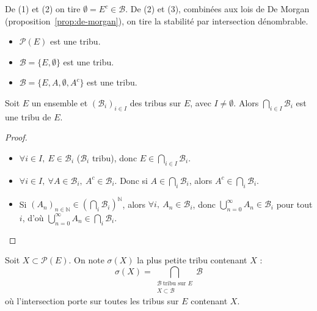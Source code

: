\begin{remarque}
De (1) et (2) on tire $\emptyset = E^c \in \mathcal{B}$. De (2) et (3), combinées aux lois de De Morgan (proposition~\ref{prop:de-morgan}), on tire la stabilité par intersection dénombrable.
\end{remarque}

\begin{exemple}
\begin{itemize}
\item $\mathcal{P}(E)$ est une tribu.
\item $\mathcal{B}=\{E,\emptyset\}$ est une tribu.
\item $\mathcal{B}=\{E,A,\emptyset,A^c\}$ est une tribu.
\end{itemize}
\end{exemple}

\begin{prop}
\label{prop:inter-tribus}
Soit $E$ un ensemble et $(\mathcal{B}_i)_{i\in I}$ des tribus sur $E$, avec $I\neq\emptyset$. Alors $\displaystyle\bigcap_{i\in I}\mathcal{B}_i$ est une tribu de $E$.
\end{prop}

\begin{proof}
\begin{itemize}
\item $\forall i\in I,\ E\in\mathcal{B}_i$ ($\mathcal{B}_i$ tribu), donc $E\in\displaystyle\bigcap_{i\in I}\mathcal{B}_i$.
\item $\forall i\in I,\ \forall A\in\mathcal{B}_i,\ A^c\in\mathcal{B}_i$. Donc si $A\in\displaystyle\bigcap_i\mathcal{B}_i$, alors $A^c\in\displaystyle\bigcap_i\mathcal{B}_i$.
\item Si $(A_n)_{n\in\mathbb{N}} \in \left(\displaystyle\bigcap_i\mathcal{B}_i\right)^{\mathbb{N}}$, alors $\forall i,\ A_n\in\mathcal{B}_i$, donc $\displaystyle\bigcup_{n=0}^{\infty}A_n\in\mathcal{B}_i$ pour tout $i$, d'où $\displaystyle\bigcup_{n=0}^{\infty}A_n \in \displaystyle\bigcap_i\mathcal{B}_i$.
\end{itemize}
\end{proof}

\begin{defi}
Soit $X\subset\mathcal{P}(E)$. On note $\sigma(X)$ la plus petite tribu contenant $X$ :
\[\sigma(X) = \bigcap_{\substack{\mathcal{B}\ \text{tribu sur } E \\ X\subset\mathcal{B}}} \mathcal{B}\]
où l'intersection porte sur toutes les tribus sur $E$ contenant $X$.
\end{defi}

